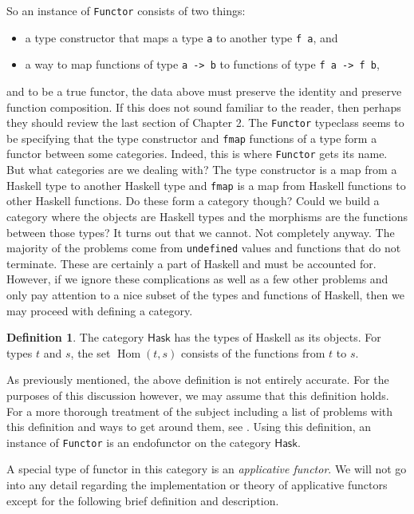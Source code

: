 \documentclass[MS, xcolor=dvipsnames]{wfuthesis}
\def\Hask{\mathsf{Hask}}
\DeclareMathOperator{\Hom}{Hom}
\theoremstyle{definition}
\newtheorem{definition}[theorem]{Definition}
\begin{document}
So an instance of \lstinline{Functor} consists of two things: 
\begin{itemize}
  \item a type constructor that maps a type \lstinline{a} to another type \lstinline{f a}, and
  \item a way to map functions of type \lstinline{a -> b} to functions of type \lstinline{f a -> f b},
\end{itemize}
and to be a true functor, the data above must preserve the identity and preserve function composition. If this does not sound familiar to the reader, then perhaps they should review the last section of Chapter 2. The \lstinline{Functor} typeclass seems to be specifying that the type constructor and \lstinline{fmap} functions of a type form a functor between some categories. Indeed, this is where \lstinline{Functor} gets its name. But what categories are we dealing with? The type constructor is a map from a Haskell type to another Haskell type and \lstinline{fmap} is a map from Haskell functions to other Haskell functions. Do these form a category though? Could we build a category where the objects are Haskell types and the morphisms are the functions between those types? It turns out that we cannot. Not completely anyway. The majority of the problems come from \lstinline{undefined} values and functions that do not terminate. These are certainly a part of Haskell and must be accounted for. However, if we ignore these complications as well as a few other problems and only pay attention to a nice subset of the types and functions of Haskell, then we may proceed with defining a category. 
\begin{definition}
  The category $\Hask$ has the types of Haskell as its objects. For types $t$ and $s$, the set $\Hom(t,s)$ consists of the functions from $t$ to $s$. 
\end{definition}
As previously mentioned, the above definition is not entirely accurate. For the purposes of this discussion however, we may assume that this definition holds. For a more thorough treatment of the subject including a list of problems with this definition and ways to get around them, see \cite{Milewski2019}. Using this definition, an instance of \lstinline{Functor} is an endofunctor on the category $\Hask$. \par 
A special type of functor in this category is an \emph{applicative functor}. We will not go into any detail regarding the implementation or theory of applicative functors except for the following brief definition and description. %
\end{document}
